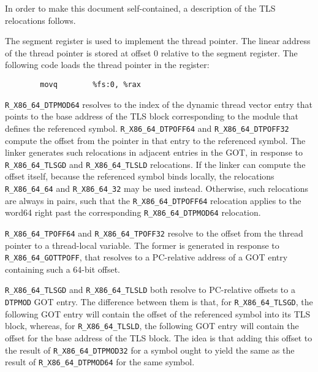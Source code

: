 In order to make this document self-contained, a description of the
TLS relocations follows.

The  segment register is used to implement the thread pointer.
The linear address of the thread pointer is stored at offset 0 relative
to the  segment register.  The following code loads the thread
pointer in the  register:

\begin{footnotesize}
\begin{verbatim}
        movq        %fs:0, %rax
\end{verbatim}
\end{footnotesize}

\begin{sloppypar}
\texttt{R_X86_64_DTPMOD64} resolves to the index of the dynamic thread
vector entry that points to the base address of the TLS block
corresponding to the module that defines the referenced symbol.
\texttt{R_X86_64_DTPOFF64} and \texttt{R_X86_64_DTPOFF32} compute the
offset from the pointer in that entry to the referenced symbol.  The
linker generates such relocations in adjacent entries in the GOT, in
response to \texttt{R_X86_64_TLSGD} and \texttt{R_X86_64_TLSLD}
relocations.  If the linker can compute the offset itself, because the
referenced symbol binds locally, the relocations \texttt{R_X86_64_64} and \texttt{R_X86_64_32} may be used instead.
Otherwise, such relocations are always in pairs, such that the
\texttt{R_X86_64_DTPOFF64} relocation applies to the word64 right past the
corresponding \texttt{R_X86_64_DTPMOD64} relocation.
\end{sloppypar}

\texttt{R_X86_64_TPOFF64} and \texttt{R_X86_64_TPOFF32} resolve to the
offset from the thread pointer to a thread-local variable.  The former
is generated in response to \texttt{R_X86_64_GOTTPOFF}, that resolves
to a PC-relative address of a GOT entry containing such a 64-bit
offset.

\texttt{R_X86_64_TLSGD} and \texttt{R_X86_64_TLSLD} both resolve to
PC-relative offsets to a \texttt{DTPMOD} GOT entry.  The difference
between them is that, for \texttt{R_X86_64_TLSGD}, the following GOT entry will
contain the offset of the referenced symbol into its TLS block,
whereas, for \texttt{R_X86_64_TLSLD}, the following GOT entry will contain the
offset for the base address of the TLS block.  The idea is that adding
this offset to the result of \texttt{R_X86_64_DTPMOD32} for a symbol ought to
yield the same as the result of \texttt{R_X86_64_DTPMOD64} for the same symbol.

